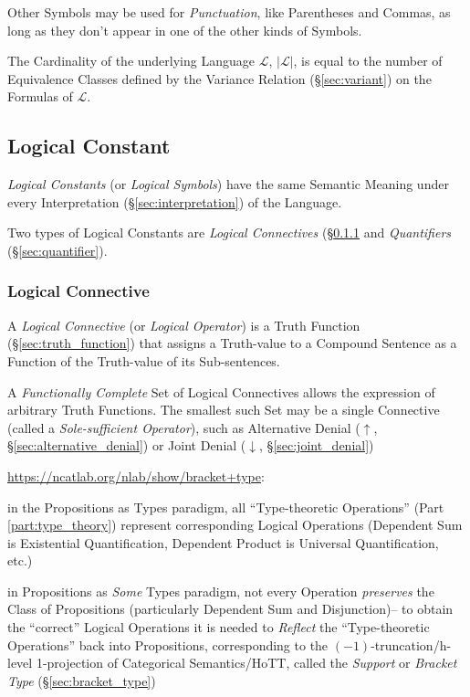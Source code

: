 Other Symbols may be used for \emph{Punctuation}, like Parentheses and
Commas, as long as they don't appear in one of the other kinds of
Symbols.

The Cardinality of the underlying Language $\mathcal{L}$,
$|\mathcal{L}|$, is equal to the number of Equivalence Classes defined
by the Variance Relation (\S\ref{sec:variant}) on the Formulas of
$\mathcal{L}$.



\subsection{Logical Constant}\label{sec:logical_constant}

\emph{Logical Constants} (or \emph{Logical Symbols}) have the same
Semantic Meaning under every Interpretation
(\S\ref{sec:interpretation}) of the Language.

Two types of Logical Constants are \emph{Logical Connectives}
(\S\ref{sec:logical_connective} and \emph{Quantifiers}
(\S\ref{sec:quantifier}).



\subsubsection{Logical Connective}\label{sec:logical_connective}

A \emph{Logical Connective} (or \emph{Logical Operator}) is a Truth Function
(\S\ref{sec:truth_function}) that assigns a Truth-value to a Compound Sentence
as a Function of the Truth-value of its Sub-sentences.

A \emph{Functionally Complete} Set of Logical Connectives allows the expression
of arbitrary Truth Functions. The smallest such Set may be a single Connective
(called a \emph{Sole-sufficient Operator}), such as Alternative Denial
($\uparrow$, \S\ref{sec:alternative_denial}) or Joint Denial ($\downarrow$,
\S\ref{sec:joint_denial})

\fist \url{https://ncatlab.org/nlab/show/bracket+type}:

in the Propositions as Types paradigm, all ``Type-theoretic Operations'' (Part
\ref{part:type_theory}) represent corresponding Logical Operations (Dependent
Sum is Existential Quantification, Dependent Product is Universal
Quantification, etc.)

in Propositions as \emph{Some} Types paradigm, not every Operation
\emph{preserves} the Class of Propositions (particularly Dependent Sum and
Disjunction)-- to obtain the ``correct'' Logical Operations it is needed to
\emph{Reflect} the ``Type-theoretic Operations'' back into Propositions,
corresponding to the $(-1)$-truncation/h-level 1-projection of Categorical
Semantics/HoTT, called the \emph{Support} or \emph{Bracket Type}
(\S\ref{sec:bracket_type})



